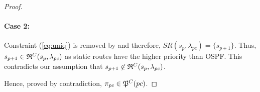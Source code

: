 \begin{proof}
\paragraph{Case 2:} Constraint (\ref{eq:uniq}) is removed by 
 and therefore, $SR(s_p, \lambda_{pc}) = \{s_{p+1}\}$. 
Thus, $s_{p+1} \in \mathfrak{R}^C(s_{p}, \lambda_{pc})$ as static routes 
have the higher priority than OSPF. This contradicts our assumption
that $s_{p+1} \not\in \mathfrak{R}^C(s_{p}, \lambda_{pc})$. 

Hence, proved by contradiction, $\pi_{pc} \in \mathfrak{P}^C(pc)$.
\end{proof}